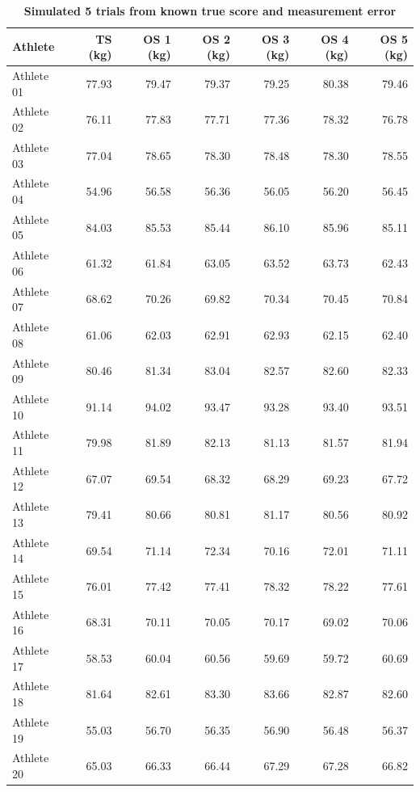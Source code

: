\documentclass[
]{book}
\begin{document}
\begin{table}

\caption{\label{tab:bodyweight-data}\textbf{Simulated 5 trials from known true score and measurement error}}
\centering
\begin{tabular}[t]{lrrrrrr}
\toprule
Athlete & TS (kg) & OS 1 (kg) & OS 2 (kg) & OS 3 (kg) & OS 4 (kg) & OS 5 (kg)\\
\midrule
Athlete 01 & 77.93 & 79.47 & 79.37 & 79.25 & 80.38 & 79.46\\
Athlete 02 & 76.11 & 77.83 & 77.71 & 77.36 & 78.32 & 76.78\\
Athlete 03 & 77.04 & 78.65 & 78.30 & 78.48 & 78.30 & 78.55\\
Athlete 04 & 54.96 & 56.58 & 56.36 & 56.05 & 56.20 & 56.45\\
Athlete 05 & 84.03 & 85.53 & 85.44 & 86.10 & 85.96 & 85.11\\
\addlinespace
Athlete 06 & 61.32 & 61.84 & 63.05 & 63.52 & 63.73 & 62.43\\
Athlete 07 & 68.62 & 70.26 & 69.82 & 70.34 & 70.45 & 70.84\\
Athlete 08 & 61.06 & 62.03 & 62.91 & 62.93 & 62.15 & 62.40\\
Athlete 09 & 80.46 & 81.34 & 83.04 & 82.57 & 82.60 & 82.33\\
Athlete 10 & 91.14 & 94.02 & 93.47 & 93.28 & 93.40 & 93.51\\
\addlinespace
Athlete 11 & 79.98 & 81.89 & 82.13 & 81.13 & 81.57 & 81.94\\
Athlete 12 & 67.07 & 69.54 & 68.32 & 68.29 & 69.23 & 67.72\\
Athlete 13 & 79.41 & 80.66 & 80.81 & 81.17 & 80.56 & 80.92\\
Athlete 14 & 69.54 & 71.14 & 72.34 & 70.16 & 72.01 & 71.11\\
Athlete 15 & 76.01 & 77.42 & 77.41 & 78.32 & 78.22 & 77.61\\
\addlinespace
Athlete 16 & 68.31 & 70.11 & 70.05 & 70.17 & 69.02 & 70.06\\
Athlete 17 & 58.53 & 60.04 & 60.56 & 59.69 & 59.72 & 60.69\\
Athlete 18 & 81.64 & 82.61 & 83.30 & 83.66 & 82.87 & 82.60\\
Athlete 19 & 55.03 & 56.70 & 56.35 & 56.90 & 56.48 & 56.37\\
Athlete 20 & 65.03 & 66.33 & 66.44 & 67.29 & 67.28 & 66.82\\
\bottomrule
\end{tabular}
\end{table}
\end{document}
